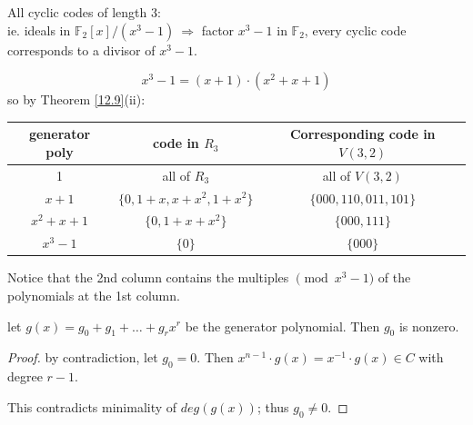 \documentclass{article}
\theoremstyle{definition}
\newenvironment{lemma}[1]
{\renewcommand\theinnerlemma{#1}\innerlemma}
{\endinnerlemma}
\newenvironment{eg}[1]
{\renewcommand\theinnereg{#1}\innereg}
{\endinnereg}
\begin{document}
\begin{eg}{12.10}
  All cyclic codes of length $3$:\\
  ie. ideals in $\mathbb{F}_2[x]/(x^3-1) ~\Longrightarrow$ factor $x^3-1$ in $\mathbb{F}_2$, every cyclic code corresponds to a divisor of $x^3-1$.

  $$x^3-1 = (x+1) \cdot (x^2+x+1)$$
  so by Theorem \ref{12.9}(ii):

  \begin{center}
    \begin{tabular}{ c c c }
      generator poly & code in $R_3$ & Corresponding code in $V(3,2)$\\
      \hline
      1 & all of $R_3$ & all of $V(3,2)$ \\ 
      $x+1$ & $\{0, 1+x, x+x^2,1+x^2\}$ & $\{000, 110, 011, 101\}$ \\  
      $x^2+x+1$ & $\{0, 1+x+x^2\}$ & $\{000, 111\}$ \\  
      $x^3-1$ & $\{0\}$ & $\{000\}$
    \end{tabular}
  \end{center}

  Notice that the 2nd column contains the multiples $\pmod{x^3-1}$ of the polynomials at the 1st column.
\end{eg}

\begin{lemma}{12.11}
  let $g(x)=g_0 + g_1 + \ldots + g_r x^r$ be the generator polynomial. Then $g_0$ is nonzero.
\end{lemma}
\begin{proof}
  by contradiction, let $g_0=0$. Then $x^{n-1} \cdot g(x) = x^{-1} \cdot g(x) \in C$ with degree $r-1$.

  This contradicts minimality of $deg(g(x))$; thus $g_0 \neq 0$.
\end{proof}
\end{document}
